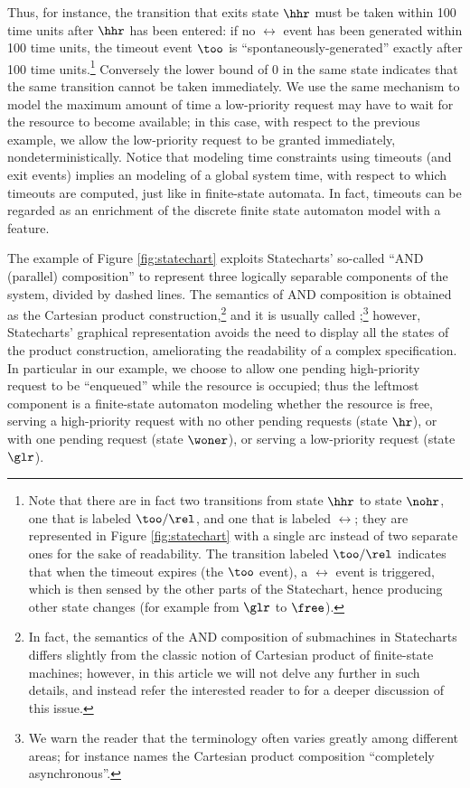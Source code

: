 Thus, for instance, the transition that exits state $\hhr$ must be
taken within 100 time units after $\hhr$ has been entered: if no
$\rel$ event has been generated within 100 time units, the timeout
event $\too$ is ``spontaneously-generated'' exactly after 100 time
units.\footnote{Note that there are in fact two transitions from state
  $\hhr$ to state $\nohr$, one that is labeled $\too/\rel$, and one
  that is labeled $\rel$; they are represented in Figure
  \ref{fig:statechart} with a single arc instead of two separate ones
  for the sake of readability. The transition labeled $\too/\rel$
  indicates that when the timeout expires (the $\too$ event), a $\rel$
  event is triggered, which is then sensed by the other parts of the
  Statechart, hence producing other state changes (for example from
  $\glr$ to $\free$).}  Conversely the lower bound of 0 in the same
state indicates that the same transition cannot be taken
immediately. We use the same mechanism to model the maximum amount of
time a low-priority request may have to wait for the resource to
become available; in this case, with respect to the previous example,
we allow the low-priority request to be granted immediately,
nondeterministically. Notice that modeling time constraints using
timeouts (and exit events) implies an  modeling of a
global system time, with respect to which timeouts are computed, just
like in finite-state automata.  In fact, timeouts can be regarded as
an enrichment of the discrete finite state automaton model with a
 feature.

The example of Figure \ref{fig:statechart} exploits Statecharts'
so-called ``AND (parallel) composition'' to represent three logically
separable components of the system, divided by dashed lines. The
semantics of AND composition is obtained as the Cartesian product
construction,\footnote{In fact, the semantics of the AND composition
  of submachines in Statecharts differs slightly from the classic
  notion of Cartesian product of finite-state machines; however, in
  this article we will not delve any further in such details, and
  instead refer the interested reader to \cite{Har87} for a deeper
  discussion of this issue.} and it is usually called
;\footnote{We warn the reader that the
  terminology often varies greatly among different areas; for instance
  \cite{CL99} names the Cartesian product composition ``completely
  asynchronous''.} however, Statecharts' graphical representation
avoids the need to display all the states of the product construction,
ameliorating the readability of a complex specification. In particular
in our example, we choose to allow one pending high-priority request
to be ``enqueued'' while the resource is occupied; thus the leftmost
component is a finite-state automaton modeling whether the resource is
free, serving a high-priority request with no other pending requests
(state $\hr$), or with one pending request (state $\woner$), or
serving a low-priority request (state $\glr$).

